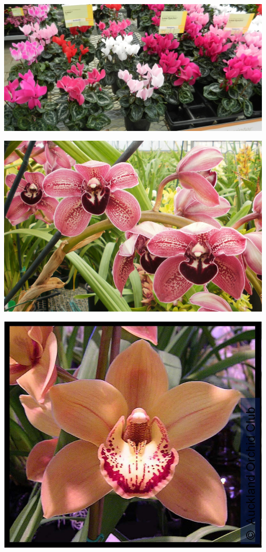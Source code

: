 \documentclass{article}
\begin{document}
\begin{center}
\includegraphics[height=0.9\textheight, angle=90]{../Cyclamen.jpg}
\end{center}
\newpage

\begin{center}
\includegraphics[height=0.9\textheight, angle=90]{../Cymbidium.jpg}
\end{center}
\newpage

\begin{center}
\includegraphics[height=0.9\textheight, angle=90]{../Cymbidium2.jpg}
\end{center}
\newpage
\end{document}
